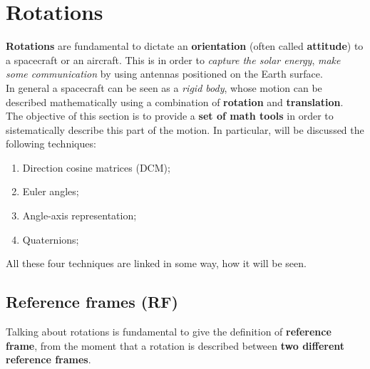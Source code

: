 \section{Rotations}
\textbf{Rotations} are fundamental to dictate an \textbf{orientation} (often called \textbf{attitude}) to a spacecraft or an aircraft. This is in order to \textit{capture the solar energy}, \textit{make some communication} by using antennas positioned on the Earth surface.\\
In general a spacecraft can be seen as a \textit{rigid body}, whose motion can be described mathematically using a combination of \textbf{rotation} and \textbf{translation}.\\ The objective of this section is to provide a \textbf{set of math tools} in order to sistematically describe this part of the motion. In particular, will be discussed the following techniques:
\begin{enumerate}
    \itemsep0em
    \item Direction cosine matrices (DCM);
    \item Euler angles; 
    \item Angle-axis representation; 
    \item Quaternions; 
\end{enumerate}
All these four techniques are linked in some way, how it will be seen.

\subsection{Reference frames (RF)}
Talking about rotations is fundamental to give the definition of \textbf{reference frame}, from the moment that a rotation is described between \textbf{two different reference frames}. \\

\hspace*{-5mm}
%

